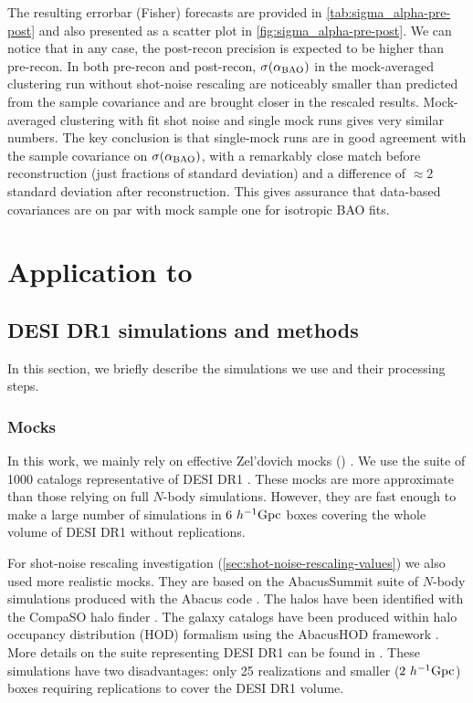The resulting errorbar (Fisher) forecasts are provided in \cref{tab:sigma_alpha-pre-post} and also presented as a scatter plot in \cref{fig:sigma_alpha-pre-post}.
We can notice that in any case, the post-recon precision is expected to be higher than pre-recon.
In both pre-recon and post-recon, $\sigma(\alpha_{\rm BAO})$ in the mock-averaged clustering run without shot-noise rescaling are noticeably smaller than predicted from the sample covariance and are brought closer in the rescaled results.
Mock-averaged clustering with fit shot noise and single mock runs gives very similar numbers.
The key conclusion is that single-mock runs are in good agreement with the sample covariance on $\sigma(\alpha_{\rm BAO})$, with a remarkably close match before reconstruction (just fractions of standard deviation) and a difference of $\approx 2$ standard deviation after reconstruction.
This gives assurance that data-based \rascalc{} covariances are on par with mock sample one for isotropic BAO fits.

\section{Application to \desimock{}}
\label{sec:validation-DESI-Y1}

\subsection{DESI DR1 simulations and methods}
\label{sec:simulations-methods}

In this section, we briefly describe the simulations we use and their processing steps.

\subsubsection{Mocks}
\label{sec:mock-types}

In this work, we mainly rely on effective Zel'dovich mocks (\ezmocks{}) \citep{EZmocks,EZmocks2021}.
We use the suite of 1000 catalogs representative of DESI DR1 \citep{KP3s8-Zhao}.
These mocks are more approximate than those relying on full $N$-body simulations.
However, they are fast enough to make a large number of simulations in $6~h^{-1}{\rm Gpc}$ boxes covering the whole volume of DESI DR1 without replications.

For shot-noise rescaling investigation (\cref{sec:shot-noise-rescaling-values}) we also used more realistic \abacussecond{} mocks.
They are based on the {\sc AbacusSummit} suite of $N$-body simulations \citep{AbacusSummit} produced with the {\sc Abacus} code \citep{Abacus-code}.
The halos have been identified with the {\sc CompaSO} halo finder \citep{CompaSO-halo-finder}.
The galaxy catalogs have been produced within halo occupancy distribution (HOD) formalism using the {\sc AbacusHOD} framework \citep{AbacusHOD}.
More details on the suite representing DESI DR1 can be found in \cite{DESI2024.III.KP4}.
These simulations have two disadvantages: only 25 realizations and smaller ($2~h^{-1}{\rm Gpc}$) boxes requiring replications to cover the DESI DR1 volume.

